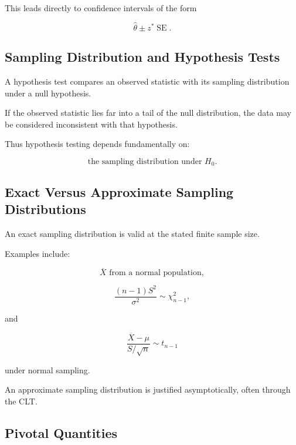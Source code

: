 This leads directly to confidence intervals of the form

\[
\boxed{
\widehat{\theta}
\pm
z^*
\operatorname{SE}.
}
\]

\subsection{Sampling Distribution and Hypothesis Tests}
\label{subsec:sampling-testing-connection}

A hypothesis test compares an observed statistic with its sampling
distribution under a null hypothesis.

If the observed statistic lies far into a tail of the null distribution,
the data may be considered inconsistent with that hypothesis.

Thus hypothesis testing depends fundamentally on:

\[
\boxed{
\text{the sampling distribution under }H_0.
}
\]

\subsection{Exact Versus Approximate Sampling Distributions}
\label{subsec:exact-versus-approx-sampling}

An exact sampling distribution is valid at the stated finite sample size.

Examples include:

\[
\boxed{
\overline{X}
\text{ from a normal population},
}
\]

\[
\boxed{
\frac{(n-1)S^2}{\sigma^2}
\sim
\chi^2_{n-1},
}
\]

and

\[
\boxed{
\frac{
\overline{X}-\mu
}{
S/\sqrt{n}
}
\sim
t_{n-1}
}
\]

under normal sampling.

An approximate sampling distribution is justified asymptotically, often
through the CLT.

\subsection{Pivotal Quantities}
\label{subsec:pivotal-quantities}

